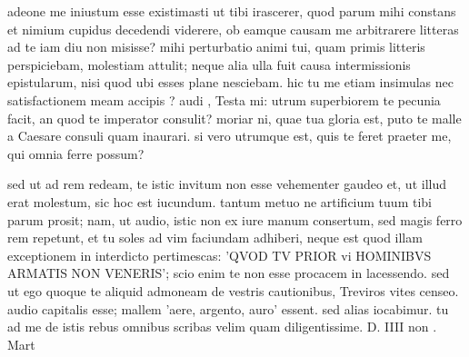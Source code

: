 


 adeone me iniustum esse existimasti ut tibi irascerer, quod parum mihi constans et nimium cupidus decedendi viderere, ob eamque causam me arbitrarere litteras ad te iam diu non misisse? mihi perturbatio animi tui, quam primis litteris perspiciebam, molestiam attulit; neque alia ulla fuit causa intermissionis epistularum, nisi quod ubi esses plane nesciebam. hic tu me etiam insimulas nec satisfactionem meam accipis ? audi , Testa mi: utrum superbiorem te pecunia facit, an quod te imperator consulit? moriar ni, quae tua gloria est, puto te malle a Caesare consuli quam inaurari. si vero utrumque est, quis te feret praeter me, qui omnia ferre possum?

 sed ut ad rem redeam, te istic invitum non esse vehementer gaudeo et, ut illud erat molestum, sic hoc est iucundum. tantum metuo ne artificium tuum tibi parum prosit; nam, ut audio, istic non ex iure manum consertum, sed magis ferro rem repetunt, et tu soles ad vim faciundam adhiberi, neque est quod illam exceptionem in interdicto pertimescas: 'QVOD TV PRIOR vi HOMINIBVS ARMATIS NON VENERIS'; scio enim te non esse procacem in lacessendo. sed ut ego quoque te aliquid admoneam de vestris cautionibus, Treviros vites censeo. audio capitalis esse; mallem 'aere, argento, auro' essent. sed alias iocabimur. tu ad me de istis rebus omnibus scribas velim quam diligentissime. D. IIII non . Mart

